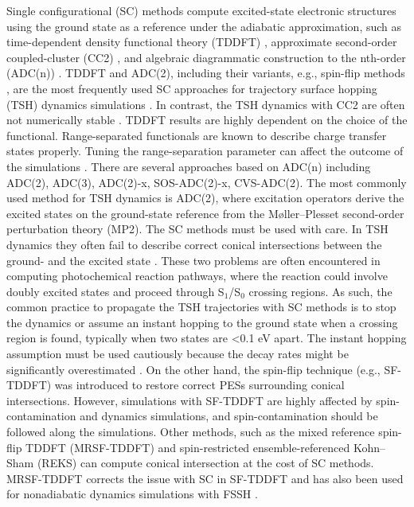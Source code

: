 \documentclass[9pt,bestpractices]{livecoms}
\begin{document}
Single configurational (SC) methods compute excited-state electronic structures using the ground state as a reference under the adiabatic approximation, such as time-dependent density functional theory (TDDFT) \cite{RN143}, approximate second-order coupled-cluster (CC2) \cite{RN68}, and algebraic diagrammatic construction to the nth-order (ADC(n)) \cite{RN128}. TDDFT and ADC(2), including their variants, e.g., spin-flip methods \cite{RN62, RN115, RN61}, are the most frequently used SC approaches for trajectory surface hopping (TSH) dynamics simulations \cite{RN67, RN66}. In contrast, the TSH dynamics with CC2 are often not numerically stable \cite{RN71}. TDDFT results are highly dependent on the choice of the functional. Range-separated functionals are known to describe charge transfer states properly. Tuning the range-separation parameter can affect the outcome of the simulations \cite{RN67}. There are several approaches based on ADC(n) including ADC(2), ADC(3), ADC(2)-x, SOS-ADC(2)-x, CVS-ADC(2). The most commonly used method for TSH dynamics is ADC(2), where excitation operators derive the excited states on the ground-state reference from the Møller–Plesset second-order perturbation theory (MP2). The SC methods must be used with care. In TSH dynamics they often fail to describe correct conical intersections between the ground- and the excited state \cite{RN65, RN64}. These two problems are often encountered in computing photochemical reaction pathways, where the reaction could involve doubly excited states and proceed through S$_1$/S$_0$ crossing regions. As such, the common practice to propagate the TSH trajectories with SC methods is to stop the dynamics or assume an instant hopping to the ground state when a crossing region is found, typically when two states are <0.1 eV apart. The instant hopping assumption must be used cautiously because the decay rates might be significantly overestimated \cite{RN63}. On the other hand, the spin-flip technique (e.g., SF-TDDFT) \cite{RN62, RN61} was introduced to restore correct PESs surrounding conical intersections. However, simulations with SF-TDDFT are highly affected by spin-contamination and dynamics simulations, and spin-contamination should be followed along the simulations. Other methods, such as the mixed reference spin-flip TDDFT (MRSF-TDDFT) \cite{RN60} and spin-restricted ensemble-referenced Kohn–Sham (REKS) \cite{RN59} can compute conical intersection at the cost of SC methods. MRSF-TDDFT corrects the issue with SC in SF-TDDFT and has also been used for nonadiabatic dynamics simulations with FSSH \cite{RN58}.
\end{document}
